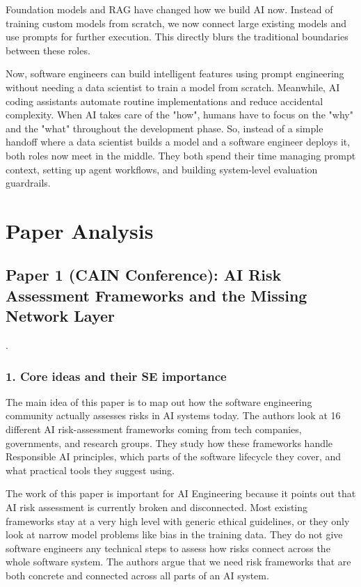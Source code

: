 \documentclass[11pt,a4paper]{article}
\begin{document}
Foundation models and RAG have changed how we build AI now. Instead of training custom models from scratch, we now connect large existing models and use prompts for further execution. This directly blurs the traditional boundaries between these roles.

Now, software engineers can build intelligent features using prompt engineering without needing a data scientist to train a model from scratch. Meanwhile, AI coding assistants automate routine implementations and reduce accidental complexity. When AI takes care of the "how", humans have to focus on the "why" and the "what" throughout the development phase. So, instead of a simple handoff where a data scientist builds a model and a software engineer deploys it, both roles now meet in the middle. They both spend their time managing prompt context, setting up agent workflows, and building system-level evaluation guardrails.

\section{Paper Analysis}

\subsection{Paper 1 (CAIN Conference): AI Risk Assessment Frameworks and the Missing Network Layer \cite{xia2023c2aira}}.

\subsubsection*{1. Core ideas and their SE importance}

The main idea of this paper is to map out how the software engineering community actually assesses risks in AI systems today. The authors look at 16 different AI risk-assessment frameworks coming from tech companies, governments, and research groups. They study how these frameworks handle Responsible AI principles, which parts of the software lifecycle they cover, and what practical tools they suggest using.

The work of this paper is important for AI Engineering because it points out that AI risk assessment is currently broken and disconnected. Most existing frameworks stay at a very high level with generic ethical guidelines, or they only look at narrow model problems like bias in the training data. They do not give software engineers any technical steps to assess how risks connect across the whole software system. The authors argue that we need risk frameworks that are both concrete and connected across all parts of an AI system.
\end{document}
